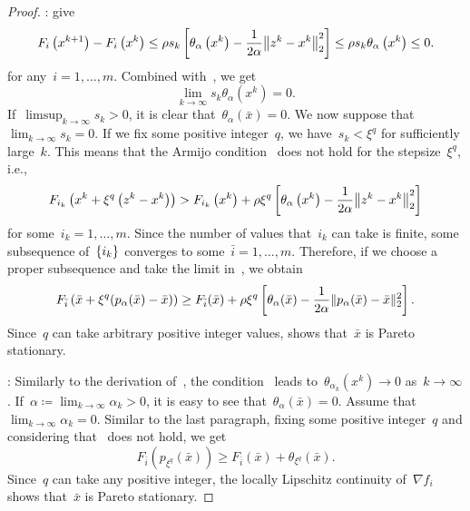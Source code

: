 \documentclass[../main]{subfiles}
\begin{document}
\begin{proof}
    :
     give
    \begin{equation}
        F_i\left(x^{k + 1}\right) - F_i\left(x^k\right) \le \rho s_k \left[ \theta_\alpha\left(x^k\right) - \frac{1}{2 \alpha} \norm*{z^k - x^k}_2^2\right] \le \rho s_k \theta_\alpha\left(x^k\right) \le 0
    .\end{equation} 
    for any~$i = 1, \dots, m$.
    Combined with~, we get
    \begin{equation} \label{eq:pgm_stationary:step_merit_zero}
        \lim_{k \to \infty} s_k \theta_\alpha\left(x^k\right) = 0
    .\end{equation}
    If~$\limsup_{k \to \infty} s_k > 0$, it is clear that~$\theta_\alpha(\bar{x}) = 0$.
    We now suppose that~$\lim_{k \to \infty} s_k = 0$.
    If we fix some positive integer~$q$, we have~$s_k < \xi^q$ for sufficiently large~$k$.
    This means that the Armijo condition~ does not hold for the stepsize~$\xi^q$, i.e.,
    \begin{equation} \label{eq:pgm_stationary:non_armijo}
        F_{i_k}\left(x^k + \xi^q \left(z^k - x^k\right)\right) > F_{i_k}\left(x^k\right) + \rho \xi^q \left[ \theta_\alpha\left(x^k\right) - \frac{1}{2 \alpha} \norm*{z^k - x^k}_2^2 \right]
    \end{equation} 
    for some~$i_k = 1, \dots, m$.
    Since the number of values that~$i_k$ can take is finite, some subsequence of~$\lbrace i_k\rbrace$ converges to some~$\bar{i} = 1, \dots, m$.
    Therefore, if we choose a proper subsequence and take the limit in~, we obtain
    \begin{equation}
        F_{\bar{i}}\left(\bar{x} + \xi^q (p_\alpha(\bar{x}) - \bar{x})\right) \ge F_{\bar{i}}(\bar{x}) + \rho \xi^q \left[ \theta_\alpha(\bar{x}) - \frac{1}{2 \alpha} \lVert p_\alpha(\bar{x}) - \bar{x}\rVert_2^2 \right]
    .\end{equation} 
    Since~$q$ can take arbitrary positive integer values,  shows that~$\bar{x}$ is Pareto stationary.

    :
    Similarly to the derivation of~, the condition~ leads to~$\theta_{\alpha_k}\left(x^k\right) \to 0$ as~$k \to \infty$.
    If~$\alpha \coloneqq \lim_{k \to \infty} \alpha_k > 0$, it is easy to see that~$\theta_\alpha(\bar{x}) = 0$.
    Assume that~$\lim_{k \to \infty} \alpha_k = 0$.
    Similar to the last paragraph, fixing some positive integer~$q$ and considering that~ does not hold, we get
    \begin{equation}
        F_{\bar{i}}(p_{\xi^q}(\bar{x})) \ge F_{\bar{i}}(\bar{x}) + \theta_{\xi^q}(\bar{x})
    .\end{equation} 
    Since~$q$ can take any positive integer, the locally Lipschitz continuity of~$\nabla f_i$ shows that~$\bar{x}$ is Pareto stationary.


\end{proof}
\end{document}
